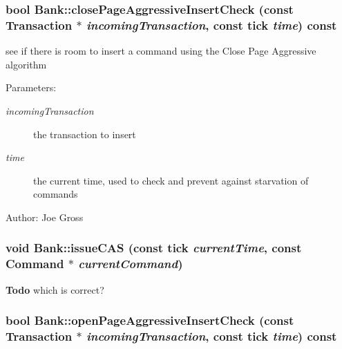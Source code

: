 \subsubsection[{closePageAggressiveInsertCheck}]{\setlength{\rightskip}{0pt plus 5cm}bool Bank::closePageAggressiveInsertCheck (const {\bf Transaction} $\ast$ {\em incomingTransaction}, \/  const tick {\em time}) const}\label{class_d_r_a_msim_i_i_1_1_bank_a168722615032aaa2924257d78dc66a9}


see if there is room to insert a command using the Close Page Aggressive algorithm 

\begin{Desc}
\item[Parameters:]
\begin{description}
\item[{\em incomingTransaction}]the transaction to insert \item[{\em time}]the current time, used to check and prevent against starvation of commands \end{description}
\end{Desc}
\begin{Desc}
\item[Author:]Joe Gross \end{Desc}
\subsubsection[{issueCAS}]{\setlength{\rightskip}{0pt plus 5cm}void Bank::issueCAS (const tick {\em currentTime}, \/  const {\bf Command} $\ast$ {\em currentCommand})}\label{class_d_r_a_msim_i_i_1_1_bank_1f759cc59082c2ca03271ca55f3ab1f6}




\begin{Desc}
\item[{\bf Todo}]which is correct? \end{Desc}
\subsubsection[{openPageAggressiveInsertCheck}]{\setlength{\rightskip}{0pt plus 5cm}bool Bank::openPageAggressiveInsertCheck (const {\bf Transaction} $\ast$ {\em incomingTransaction}, \/  const tick {\em time}) const}\label{class_d_r_a_msim_i_i_1_1_bank_ee120e04392028aace4dfa79c408e3d4}


